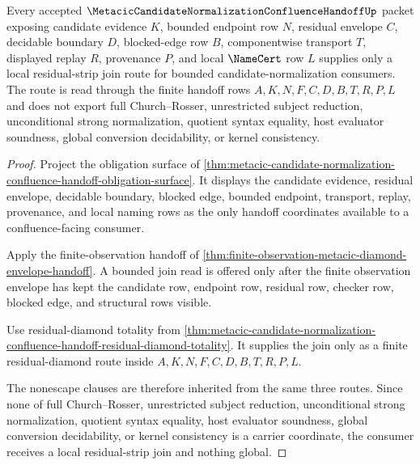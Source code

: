 \begin{theorem}
\label{thm:metacic-candidate-normalization-confluence-handoff-residual-strip-local-join}
Every accepted $\MetacicCandidateNormalizationConfluenceHandoffUp$ packet exposing candidate evidence $K$, bounded endpoint row $N$, residual envelope $C$, decidable boundary $D$, blocked-edge row $B$, componentwise transport $T$, displayed replay $R$, provenance $P$, and local $\NameCert$ row $L$ supplies only a local residual-strip join route for bounded candidate-normalization consumers. The route is read through the finite handoff rows $A,K,N,F,C,D,B,T,R,P,L$ and does not export full Church--Rosser, unrestricted subject reduction, unconditional strong normalization, quotient syntax equality, host evaluator soundness, global conversion decidability, or kernel consistency.
\end{theorem}
\begin{proof}
Project the obligation surface of \autoref{thm:metacic-candidate-normalization-confluence-handoff-obligation-surface}. It displays the candidate evidence, residual envelope, decidable boundary, blocked edge, bounded endpoint, transport, replay, provenance, and local naming rows as the only handoff coordinates available to a confluence-facing consumer.

Apply the finite-observation handoff of \autoref{thm:finite-observation-metacic-diamond-envelope-handoff}. A bounded join read is offered only after the finite observation envelope has kept the candidate row, endpoint row, residual row, checker row, blocked edge, and structural rows visible.

Use residual-diamond totality from \autoref{thm:metacic-candidate-normalization-confluence-handoff-residual-diamond-totality}. It supplies the join only as a finite residual-diamond route inside $A,K,N,F,C,D,B,T,R,P,L$.

The nonescape clauses are therefore inherited from the same three routes. Since none of full Church--Rosser, unrestricted subject reduction, unconditional strong normalization, quotient syntax equality, host evaluator soundness, global conversion decidability, or kernel consistency is a carrier coordinate, the consumer receives a local residual-strip join and nothing global.
\end{proof}

